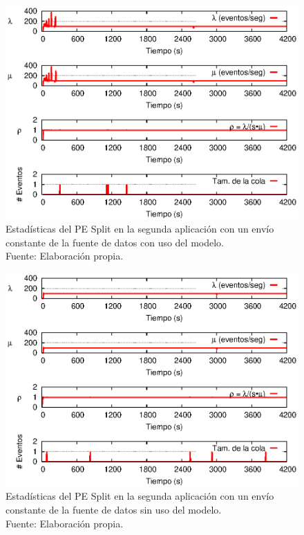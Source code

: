 \begin{figure}[!ht]
    \centering
    \captionsetup{justification=centering}
    \includegraphics[scale=1]{images/exp/app2/uniform/cm/statusSplitPE.eps}
    \caption[Estadísticas del PE Split en la segunda aplicación con un envío constante de la fuente de datos con uso del modelo.]{Estadísticas del PE Split en la segunda aplicación con un envío constante de la fuente de datos con uso del modelo.\\Fuente: Elaboración propia.}
    \label{fig:app2-uniform-statusSplitPE-cm}
\end{figure}

\begin{figure}[!ht]
    \centering
    \captionsetup{justification=centering}
    \includegraphics[scale=1]{images/exp/app2/uniform/sm/statusSplitPE.eps}
    \caption[Estadísticas del PE Split en la segunda aplicación con un envío constante de la fuente de datos sin uso del modelo.]{Estadísticas del PE Split en la segunda aplicación con un envío constante de la fuente de datos sin uso del modelo.\\Fuente: Elaboración propia.}
    \label{fig:app2-uniform-statusSplitPE-sm}
\end{figure}

